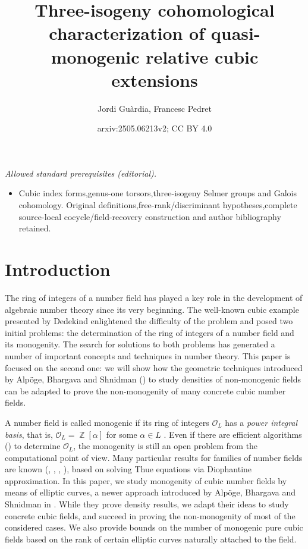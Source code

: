 \documentclass[oneside]{amsart}
\title{Three-isogeny cohomological characterization of quasi-monogenic relative cubic extensions}
\author{Jordi Guàrdia, Francesc Pedret}
\date{arxiv:2505.06213v2; CC BY 4.0}
\DeclareMathOperator{\ZZ}{\mathbb{Z}}
\theoremstyle{definition}
\begin{document}
\maketitle
\noindent\textit{Allowed standard prerequisites (editorial).}\begin{itemize}
\item Cubic index forms,genus-one torsors,three-isogeny Selmer groups and Galois cohomology. Original definitions,free-rank/discriminant hypotheses,complete source-local cocycle/field-recovery construction and author bibliography retained.
\end{itemize}\medskip
\section{Introduction}

The ring of integers of a number field has played a key role in the development of algebraic number theory since its very beginning. The well-known cubic example presented by Dedekind enlightened  the difficulty of the problem and posed two initial problems: the determination of the ring of integers of a number field and its monogenity. The search for solutions to both problems has generated a number of  important concepts and techniques  in number theory. This paper is focused on the second one: we will show how the   geometric techniques introduced by Alpöge, Bhargava and Shnidman (\cite{Bhargava}) to study densities of  non-monogenic fields can be adapted to prove the non-monogenity of many concrete cubic number fields. 

A number field is called monogenic if its ring of integers $\mathcal{O}_L $ has a {\it power integral basis}, that is,  $\mathcal{O}_L = \ZZ[\alpha]$ for some $\alpha \in L$ . Even if  there are efficient algorithms (\cite{MontesAlgorithm}) to determine $\mathcal{O}_L$,  the monogenity is still an open problem from the computational point of view. Many particular results for families of number fields are known (\cite{WILDANGER2000188}, \cite{GAAL1993563}, \cite{GAAL199690}, \cite{Gaal89}), based on solving Thue equations via Diophantine approximation. In this paper, we study monogenity of cubic number fields by means of  elliptic curves, a newer approach introduced by Alpöge, Bhargava and Shnidman in \cite{Bhargava}.  While they prove density results, we adapt their ideas to study concrete cubic fields, and succeed in proving the non-monogenity of most of the considered cases. We also provide bounds on the number of monogenic pure cubic fields based on the rank of certain elliptic curves naturally attached to the field.
\end{document}
